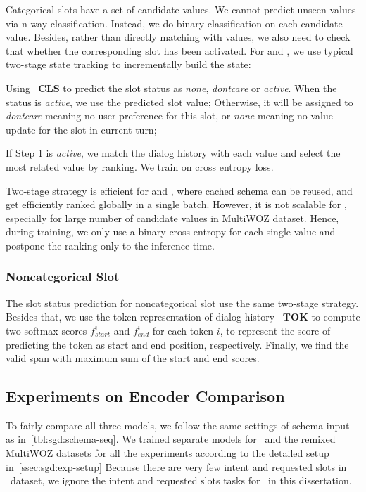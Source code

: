 Categorical slots have a set of candidate values. We cannot predict
unseen values via n-way classification. Instead, we do binary
classification on each candidate value. Besides, rather than directly
matching with values, we also need to check that whether the
corresponding slot has been activated. For \CE and \FE, we use typical
two-stage state tracking to incrementally build the state:
\begin{inparaenum}[{\bf Step} 1.]
\item Using ~$\mathbf{CLS}$ to predict the slot status as
  \textit{none}, \textit{dontcare} or \textit{active}. When the status is
  \textit{active}, we use the predicted slot value; Otherwise, it
  will be assigned to \textit{dontcare} meaning no user preference for this
  slot, or \textit{none} meaning no value update for the slot in current turn;
\item If Step 1 is \textit{active}, we match the dialog
  history with each value and select the most related value by ranking. We train on cross entropy loss.
\end{inparaenum}
Two-stage strategy is efficient for \DE and \FE, where cached schema
can be reused, and get efficiently ranked globally in a single
batch. However, it is not scalable for \CE, especially for large
number of candidate values in MultiWOZ dataset. Hence, during
training, we only use a binary cross-entropy for each single value and
postpone the ranking only to the inference time.

\subsubsection{Noncategorical Slot}
\label{sssec:sgd:noncategorical-slot}
The slot status prediction for
noncategorical slot use the same two-stage strategy. Besides that, we
use the token representation of dialog history ~$\mathbf{TOK}$ to
compute two softmax scores $f^{i}_{start}$ and $f^{i}_{end}$ for each
token $i$, to represent the score of predicting the token as start and
end position, respectively. Finally, we find the valid span with
maximum sum of the start and end scores.

\subsection{Experiments on Encoder Comparison}
\label{ssec:encoder-results}
To fairly compare all three models, we follow the same settings of
schema input as in~\autoref{tbl:sgd:schema-seq}. We trained separate
models for \sgdst~and the remixed MultiWOZ datasets for all the
experiments according to the detailed setup
in~\autoref{ssec:sgd:exp-setup} Because there are very few intent and
requested slots in \multiwoz~dataset, we ignore the intent and
requested slots tasks for \multiwoz~in this dissertation.


